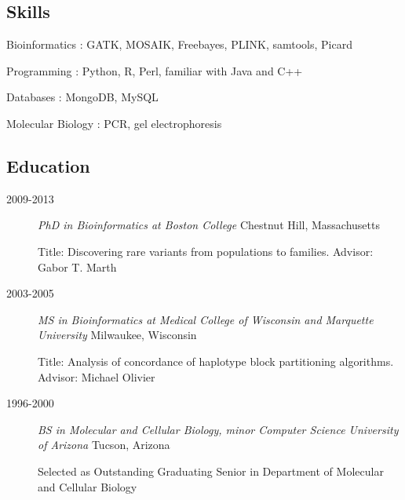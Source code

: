 \documentclass[]{article}
\begin{document}
\subsection{Skills}\label{skills}

Bioinformatics : GATK, MOSAIK, Freebayes, PLINK, samtools, Picard

Programming : Python, R, Perl, familiar with Java and C++

Databases : MongoDB, MySQL

Molecular Biology : PCR, gel electrophoresis

\subsection{Education}\label{education}

\begin{description}
\item[2009-2013]
\emph{PhD in Bioinformatics at Boston College} Chestnut Hill, Massachusetts

Title: Discovering rare variants from populations to families. Advisor:
Gabor T. Marth
\item[2003-2005]
\emph{MS in Bioinformatics at Medical College of Wisconsin and Marquette
University} Milwaukee, Wisconsin

Title: Analysis of concordance of haplotype block partitioning
algorithms. Advisor: Michael Olivier
\item[1996-2000]
\emph{BS in Molecular and Cellular Biology, minor Computer Science
University of Arizona} Tucson, Arizona

Selected as Outstanding Graduating Senior in Department of Molecular and
Cellular Biology
\end{description}

%
%
\end{document}
